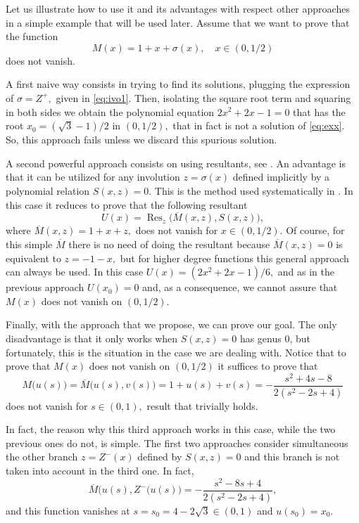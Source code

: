 \documentclass[12pt,a4paper,reqno]{amsart}
\begin{document}
Let us illustrate how to use it and its advantages with respect
other approaches in a simple example that will be used later. Assume
that we want to prove that the function
\begin{equation}\label{eq:exx}
M(x)=1+x+\sigma(x),\quad x\in(0,1/2) \end{equation}
 does not vanish.

A first naive way consists in trying to find its solutions, plugging
the expression of $\sigma=Z^+,$ given in \eqref{eq:ivo1}. Then,
isolating the square root term and squaring in both sides we obtain
the polynomial equation $2x^2+2x-1=0$ that has the root $x_0=(\sqrt
3-1)/2$ in $(0,1/2),$ that in fact is not a solution of
\eqref{eq:exx}. So, this approach fails unless we discard this
spurious solution.

A second powerful approach consists on using resultants, see
\cite{Stu2002}. An advantage  is that it can be utilized for any
involution $z=\sigma(x)$ defined implicitly by a polynomial relation
$S(x,z)=0.$ This is the method used systematically in
\cite{GraManVil2011,ManVil2002}. In this case it reduces to prove
that the following resultant
\[
U(x)=\operatorname{Res}_z\big({\overline M}(x,z),S(x,z) \big),
\]
where ${\overline M}(x,z)=1+x+z,$ does not vanish for $x\in(0,1/2).$
Of course, for this simple ${\overline M}$ there is no need of doing
the resultant because ${\overline M}(x,z)=0$ is equivalent to
$z=-1-x,$ but for higher degree functions this general approach can
always be used. In this case $U(x)=(2x^2+2x-1)/6,$ and as in the
previous approach $U(x_0)=0$ and, as a consequence, we cannot assure
that $M(x)$ does not vanish on $(0,1/2).$

Finally, with the approach that we propose, we can prove our goal.
The only disadvantage is that it only works when $S(x,z)=0$ has
genus 0, but fortunately, this is the situation in the case we are
dealing with. Notice that to prove that $M(x)$ does not vanish on
$(0,1/2)$ it suffices to prove that
\[
{M}\big(u(s)\big)=\overline{M}\big(u(s),
v(s)\big)=1+u(s)+v(s)=-\frac{s^2+4s-8}{2(s^2-2s+4)}
\]
does not vanish for $s\in(0,1),$ result that trivially holds.

In fact, the reason why this third approach works in this case,
while the two previous ones do not, is simple. The first two
approaches consider simultaneous  the other branch $z=Z^-(x)$
defined  by $S(x,z)=0$ and this branch is not taken into account in
the third one. In fact,
\[
\overline{M}\big(u(s), Z^-(u(s)\big)=-\frac{s^2-8s+4}{2(s^2-2s+4)},
\]
and this function vanishes at $s=s_0=4-2\sqrt3\in(0,1)$ and
$u(s_0)=x_0.$
\end{document}
